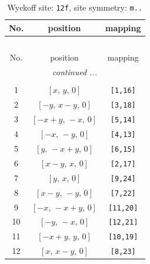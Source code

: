 \documentclass[fleqn,8pt]{jsarticle}
\begin{document}
\begin{longtable}{ccc}
\caption{Wyckoff site: {\tt 12f}, site symmetry: {\tt m..}}
 \\
 \hline \hline
No. & position & mapping \\ \hline \endfirsthead

\multicolumn{2}{l}{\tablename\ \thetable{}} \\
 \hline \hline
No. & position & mapping \\ \hline \endhead

 \hline \hline
\multicolumn{2}{r}{\footnotesize\it continued ...} \\ \endfoot

 \hline \hline
\multicolumn{2}{r}{} \\ \endlastfoot

1 & $\left[ x,\, y,\, 0 \right]$ & {\tt [1,16]} \\ \hline
2 & $\left[ - y,\, x - y,\, 0 \right]$ & {\tt [3,18]} \\ \hline
3 & $\left[ - x + y,\, - x,\, 0 \right]$ & {\tt [5,14]} \\ \hline
4 & $\left[ - x,\, - y,\, 0 \right]$ & {\tt [4,13]} \\ \hline
5 & $\left[ y,\, - x + y,\, 0 \right]$ & {\tt [6,15]} \\ \hline
6 & $\left[ x - y,\, x,\, 0 \right]$ & {\tt [2,17]} \\ \hline
7 & $\left[ y,\, x,\, 0 \right]$ & {\tt [9,24]} \\ \hline
8 & $\left[ x - y,\, - y,\, 0 \right]$ & {\tt [7,22]} \\ \hline
9 & $\left[ - x,\, - x + y,\, 0 \right]$ & {\tt [11,20]} \\ \hline
10 & $\left[ - y,\, - x,\, 0 \right]$ & {\tt [12,21]} \\ \hline
11 & $\left[ - x + y,\, y,\, 0 \right]$ & {\tt [10,19]} \\ \hline
12 & $\left[ x,\, x - y,\, 0 \right]$ & {\tt [8,23]} \\
\end{longtable}
\renewcommand{\arraystretch}{1.2}
\end{document}
